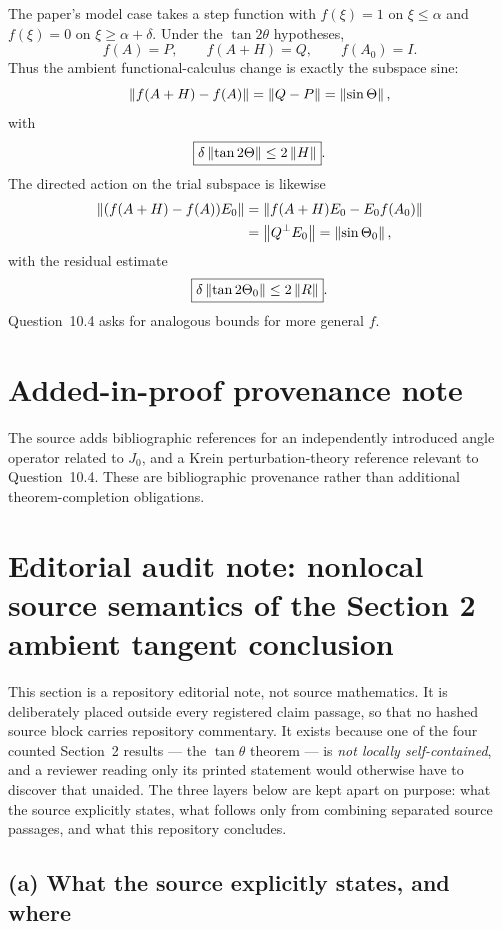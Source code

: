 The paper's model case takes a step function with $f(\xi)=1$ on $\xi\le\alpha$ and $f(\xi)=0$ on $\xi\ge\alpha+\delta$.  Under the $\tan2\theta$ hypotheses,
\[
 f(A)=P,\qquad f(A+H)=Q,\qquad f(A_0)=I.
\]
Thus the ambient functional-calculus change is exactly the subspace sine:
\[
 \left\lVert f(A+H)-f(A)\right\rVert=\left\lVert Q-P\right\rVert=\left\lVert \sin\Theta\right\rVert,
\]
with
\[
 \boxed{\delta\left\lVert \tan2\Theta\right\rVert\le2\left\lVert H\right\rVert}.
\]
The directed action on the trial subspace is likewise
\[
 \begin{aligned}
 \left\lVert (f(A+H)-f(A))E_0\right\rVert
 &=\left\lVert f(A+H)E_0-E_0f(A_0)\right\rVert\\
 &=\left\lVert Q^\perp E_0\right\rVert=\left\lVert \sin\Theta_0\right\rVert,
 \end{aligned}
\]
with the residual estimate
\[
 \boxed{\delta\left\lVert \tan2\Theta_0\right\rVert\le2\left\lVert R\right\rVert}.
\]
Question~10.4 asks for analogous bounds for more general $f$.

\section*{Added-in-proof provenance note}
The source adds bibliographic references for an independently introduced angle operator related to $J_0$, and a Krein perturbation-theory reference relevant to Question~10.4.  These are bibliographic provenance rather than additional theorem-completion obligations.

\section*{Editorial audit note: nonlocal source semantics of the Section 2 ambient tangent conclusion}

This section is a repository editorial note, not source mathematics.  It is deliberately placed outside every registered claim passage, so that no hashed source block carries repository commentary.  It exists because one of the four counted Section~2 results --- the $\tan\theta$ theorem --- is \emph{not locally self-contained}, and a reviewer reading only its printed statement would otherwise have to discover that unaided.  The three layers below are kept apart on purpose: what the source explicitly states, what follows only from combining separated source passages, and what this repository concludes.

\subsection*{(a) What the source explicitly states, and where}

